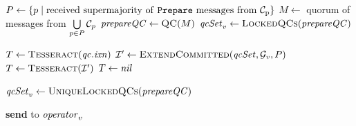 \begin{breakablealgorithm}
\caption{The Protocol: Stage 2 - Propose}\label{alg:step2}
\begin{algorithmic}[1]         
    \State $P\gets\{p\mid \mathrm{received\ supermajority\ of\ \txt{Prepare}\ messages\ from\ \calC_p}\}$
    \State $M\gets$ quorum of  messages from $\bigcup\limits_{p\in P}\mathcal{C}_p$
    \State $\mathit{prepareQC} \gets \mathrm{\textsc{QC}}(M)$
    \State $\mathit{qcSet}_v \gets \mathrm{\textsc{LockedQCs}}(\mathit{prepareQC})$
     \State {}
    
        \State $T \gets \mathrm{\textsc{Tesseract}}(\mathit{qc}.\mathit{ixn})$
        \State $\mathcal{I}' \gets \mathrm{\textsc{ExtendCommitted}}(\mathit{qcSet}, \mathcal{G}_v, P)$
        \State $T \gets \mathrm{\textsc{Tesseract}}(\mathcal{I}')$
    \Else
        \State $T \gets \mathit{nil}$
    \EndIf
    \State {}
\EndFor
\item[] 

    \State $\mathit{qcSet}_v \gets \mathrm{\textsc{UniqueLockedQCs}}(\mathit{prepareQC})$
        
        \State \textbf{send}  to $\mathit{operator}_v$
    \EndIf
\EndFor
\item[]


\end{algorithmic}
\end{breakablealgorithm}

